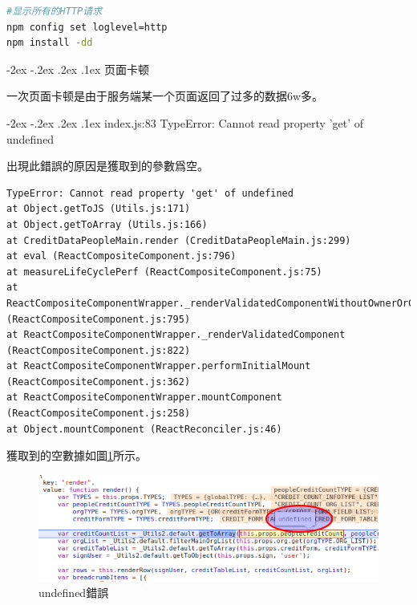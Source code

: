\documentclass[12pt]{book}
\makeatletter
\numberwithin{dummy}{section}
\theoremstyle{ocrenumbox}
\theoremstyle{blacknumex}
\theoremstyle{blacknumbox}
\theoremstyle{ocrenum}
\renewcommand\paragraph{\@startsection{paragraph}{4}{\z@}
	{-2ex \@plus-.2ex \@minus .2ex}
	{.1ex}
	{\normalfont\small\sffamily\bfseries}}
\makeatother
\begin{document}
\begin{lstlisting}[language=Bash]
#显示所有的HTTP请求
npm config set loglevel=http
npm install -dd
\end{lstlisting}



\paragraph{页面卡顿}

一次页面卡顿是由于服务端某一个页面返回了过多的数据6w多。

\paragraph{index.js:83 TypeError: Cannot read property 'get' of undefined}

出現此錯誤的原因是獲取到的參數爲空。

\begin{lstlisting}
TypeError: Cannot read property 'get' of undefined
at Object.getToJS (Utils.js:171)
at Object.getToArray (Utils.js:166)
at CreditDataPeopleMain.render (CreditDataPeopleMain.js:299)
at eval (ReactCompositeComponent.js:796)
at measureLifeCyclePerf (ReactCompositeComponent.js:75)
at ReactCompositeComponentWrapper._renderValidatedComponentWithoutOwnerOrContext (ReactCompositeComponent.js:795)
at ReactCompositeComponentWrapper._renderValidatedComponent (ReactCompositeComponent.js:822)
at ReactCompositeComponentWrapper.performInitialMount (ReactCompositeComponent.js:362)
at ReactCompositeComponentWrapper.mountComponent (ReactCompositeComponent.js:258)
at Object.mountComponent (ReactReconciler.js:46)
\end{lstlisting}

獲取到的空數據如圖\ref{fig:getundefineerror}所示。

\begin{figure}[htbp]
	\centering
	\includegraphics[scale=0.5]{getundefineerror.png}
	\caption{undefined錯誤}
	\label{fig:getundefineerror}
\end{figure}
\end{document}
